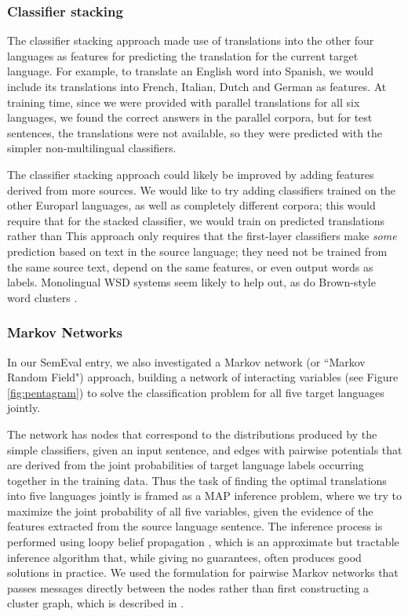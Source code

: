 \subsubsection{Classifier stacking}
The classifier stacking approach made use of translations into the other four
languages as features for predicting the translation for the current target
language.
For example, to translate an English word into Spanish, we would include its
translations into French, Italian, Dutch and German as features.
At training time, since we were provided with parallel translations for all six
languages, we found the correct answers in the parallel corpora, but for test
sentences, the translations were not available, so they were predicted with the
simpler non-multilingual classifiers.

The classifier stacking approach could likely be improved by adding features
derived from more sources.
We would like to try adding classifiers trained on the other Europarl
languages, as well as completely different corpora; this would require that for
the stacked classifier, we would train on predicted translations rather than
This approach only requires that the first-layer classifiers make \emph{some}
prediction based on text in the source language;
they need not be trained from the same source text, depend on the same
features, or even output words as labels. Monolingual WSD systems seem likely
to help out, as do Brown-style word clusters \cite{brown1992class}.

\subsubsection{Markov Networks}
In our SemEval entry, we also investigated a Markov network (or ``Markov Random
Field") approach, building a network of interacting variables (see Figure
\ref{fig:pentagram}) to solve the classification problem for all five target
languages jointly.

The network has nodes that correspond to the distributions produced by the
simple classifiers, given an input sentence, and edges with pairwise potentials
that are derived from the joint probabilities of target language labels
occurring together in the training data. 
Thus the task of finding the optimal translations into five languages jointly
is framed as a MAP inference problem, where we try to maximize the joint
probability of all five variables, given the evidence of the features extracted
from the source language sentence.
The inference process is performed using loopy belief propagation
\cite{DBLP:conf/uai/MurphyWJ99}, which is an approximate but tractable
inference algorithm that, while giving no guarantees, often produces good
solutions in practice.
We used the formulation for pairwise Markov networks that passes messages
directly between the nodes rather than first constructing a cluster graph,
which is described in \cite[\S 11.3.5.1]{Koller+Friedman:09}.

